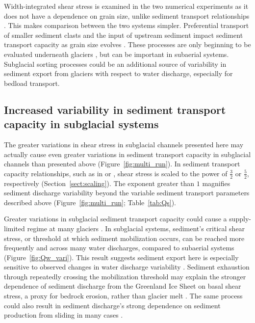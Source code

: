 \documentclass[esurf, manuscript]{copernicus}
\begin{document}
Width-integrated shear stress is examined in the two numerical experiments as it does not have a dependence on grain size, unlike sediment transport relationships \citep[][Section \ref{sect:scaling}]{meyer1948}.
This makes comparison between the two systems simpler. 
Preferential transport of smaller sediment clasts and the input of upstream sediment impact sediment transport capacity as grain size evolves \citep[e.g.][]{gomez1983}.
These processes are only beginning to be evaluated underneath glaciers \citep{aitken2024}, but can be important in subaerial systems.
Subglacial sorting processes could be an additional source of variability in sediment export from glaciers with respect to water discharge, especially for bedload transport.

\subsection{Increased variability in  sediment transport capacity in subglacial systems}
\label{sect:dis_qsc}

The greater variations in shear stress in subglacial channels presented here may actually cause even greater variations in sediment transport capacity in subglacial channels than presented above  (Figure~\ref{fig:multi_run}).
In sediment transport capacity relationships, such as in \citet{meyer1948} or \citet{engelund1967}, shear stress is scaled to the power of $\frac{3}{2}$ or $\frac{5}{2}$, respectively (Section~\ref{sect:scaling}).
The exponent greater than $1$ magnifies sediment discharge variability beyond the variable sediment transport parameters described above (Figure~\ref{fig:multi_run}; Table~\ref{tab:Qs}).

Greater variations in subglacial sediment transport capacity could cause a supply-limited regime at many glaciers \citep{alley1997}.
In subglacial systems, sediment's critical shear stress, or threshold at which sediment mobilization occurs, can be reached more frequently and across many water discharges, compared to subaerial systems (Figure~\ref{fig:Qw_vari}).
This result suggests sediment export here is especially sensitive to observed changes in water discharge variability \citep{lane2019b}.
Sediment exhaustion through repeatedly crossing the mobilization threshold may explain the stronger dependence of sediment discharge from the Greenland Ice Sheet on basal shear stress, a proxy for bedrock erosion, rather than glacier melt \citep{overeem2017}.
The same process could also result in sediment discharge's strong dependence on sediment production from sliding in many cases \citep{herman2015,koppes2015}.
\end{document}
